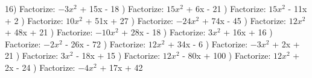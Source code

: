 \documentclass{article}%
\begin{document}
16) Factorize: $-3x^2$ + 15x - 18%
\newline%
\newline%
) Factorize: $15x^2$ + 6x - 21%
\newline%
\newline%
) Factorize: $15x^2$ - 11x + 2%
\newline%
\newline%
) Factorize: $10x^2$ + 51x + 27%
\newline%
\newline%
) Factorize: $-24x^2$ + 74x - 45%
\newline%
\newline%
) Factorize: $12x^2$ + 48x + 21%
\newline%
\newline%
) Factorize: $-10x^2$ + 28x - 18%
\newline%
\newline%
) Factorize: $3x^2$ + 16x + 16%
\newline%
\newline%
) Factorize: $-2x^2$ - 26x - 72%
\newline%
\newline%
) Factorize: $12x^2$ + 34x - 6%
\newline%
\newline%
) Factorize: $-3x^2$ + 2x + 21%
\newline%
\newline%
) Factorize: $3x^2$ - 18x + 15%
\newline%
\newline%
) Factorize: $12x^2$ - 80x + 100%
\newline%
\newline%
) Factorize: $12x^2$ + 2x - 24%
\newline%
\newline%
) Factorize: $-4x^2$ + 17x + 42%
\end{document}
